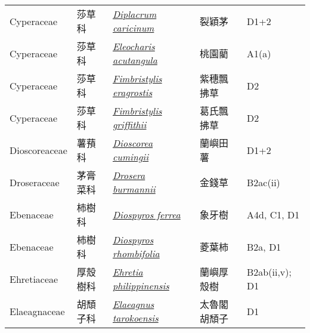{\begin{longtable}{p{2.5cm}p{2.5cm}p{4.5cm}p{2.5cm}p{3cm}}
    Cyperaceae & 莎草科 & \href{http://www.theplantlist.org/tpl1.1/search?q=Diplacrum+caricinum}{\textit{Diplacrum caricinum} } & 裂穎茅 & D1+2 \index{Diplacrum@\textit{Diplacrum}!caricinum@\textit{caricinum}}  \index{裂穎茅} \\
    Cyperaceae & 莎草科 & \href{http://www.theplantlist.org/tpl1.1/search?q=Eleocharis+acutangula}{\textit{Eleocharis acutangula} } & 桃園藺 & A1(a) \index{Eleocharis@\textit{Eleocharis}!acutangula@\textit{acutangula}}  \index{桃園藺} \\
    Cyperaceae & 莎草科 & \href{http://www.theplantlist.org/tpl1.1/search?q=Fimbristylis+eragrostis}{\textit{Fimbristylis eragrostis} } & 紫穗飄拂草 & D2 \index{Fimbristylis@\textit{Fimbristylis}!eragrostis@\textit{eragrostis}}  \index{紫穗飄拂草} \\
    Cyperaceae & 莎草科 & \href{http://www.theplantlist.org/tpl1.1/search?q=Fimbristylis+griffithii}{\textit{Fimbristylis griffithii} } & 葛氏飄拂草 & D2 \index{Fimbristylis@\textit{Fimbristylis}!griffithii@\textit{griffithii}}  \index{葛氏飄拂草} \\
    Dioscoreaceae & 薯蕷科 & \href{http://www.theplantlist.org/tpl1.1/search?q=Dioscorea+cumingii}{\textit{Dioscorea cumingii} } & 蘭嶼田薯 & D1+2 \index{Dioscorea@\textit{Dioscorea}!cumingii@\textit{cumingii}}  \index{蘭嶼田薯} \\
    Droseraceae & 茅膏菜科 & \href{http://www.theplantlist.org/tpl1.1/search?q=Drosera+burmannii}{\textit{Drosera burmannii} } & 金錢草 & B2ac(ii) \index{Drosera@\textit{Drosera}!burmannii@\textit{burmannii}}  \index{金錢草} \\
    Ebenaceae & 柿樹科 & \href{http://www.theplantlist.org/tpl1.1/search?q=Diospyros+ferrea}{\textit{Diospyros ferrea} } & 象牙樹 & A4d, C1, D1 \index{Diospyros@\textit{Diospyros}!ferrea@\textit{ferrea}}  \index{象牙樹} \\
    Ebenaceae & 柿樹科 & \href{http://www.theplantlist.org/tpl1.1/search?q=Diospyros+rhombifolia}{\textit{Diospyros rhombifolia} } & 菱葉柿 & B2a, D1 \index{Diospyros@\textit{Diospyros}!rhombifolia@\textit{rhombifolia}}  \index{菱葉柿} \\
    Ehretiaceae & 厚殼樹科 & \href{http://www.theplantlist.org/tpl1.1/search?q=Ehretia+philippinensis}{\textit{Ehretia philippinensis} } & 蘭嶼厚殼樹 & B2ab(ii,v); D1 \index{Ehretia@\textit{Ehretia}!philippinensis@\textit{philippinensis}}  \index{蘭嶼厚殼樹} \\
    Elaeagnaceae & 胡頹子科 & \href{http://www.theplantlist.org/tpl1.1/search?q=Elaeagnus+tarokoensis}{\textit{Elaeagnus tarokoensis} } & 太魯閣胡頹子 & D1 \index{Elaeagnus@\textit{Elaeagnus}!tarokoensis@\textit{tarokoensis}}  \index{太魯閣胡頹子} \\

\end{longtable}}

